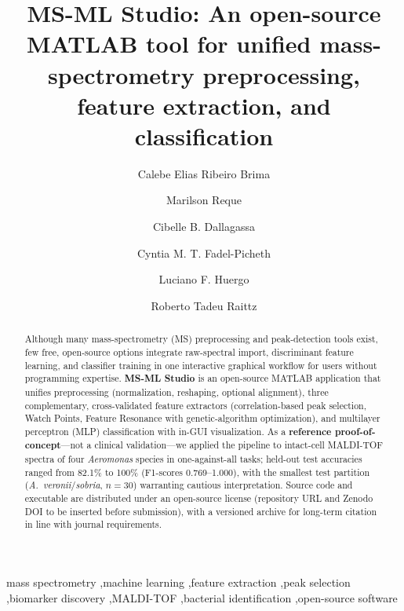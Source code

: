 \documentclass[preprint,12pt]{elsarticle}
\begin{document}
\begin{frontmatter}

\title{MS-ML Studio: An open-source MATLAB tool for unified mass-spectrometry preprocessing, feature extraction, and classification}

\address[addr1]{Departamento de Bioinform{\'a}tica, Universidade Federal do Paran{\'a}, Brazil}
\address[addr2]{Setor Litoral, Universidade Federal do Paran{\'a}, Brazil}
\address[addr3]{Departamento de Patologia M{\'e}dica, Universidade Federal do Paran{\'a}, Brazil}

\author[addr1]{Calebe Elias Ribeiro Brima}
\author[addr1]{Marilson Reque}
\author[addr3]{Cibelle B. Dallagassa}
\author[addr3]{Cyntia M. T. Fadel-Picheth}
\author[addr2]{Luciano F. Huergo}
\author[addr1]{Roberto Tadeu Raittz}

\begin{abstract}
Although many mass-spectrometry (MS) preprocessing and peak-detection tools exist, few free, open-source options integrate raw-spectral import, discriminant feature learning, and classifier training in one interactive graphical workflow for users without programming expertise. \textbf{MS-ML Studio} is an open-source MATLAB application that unifies preprocessing (normalization, reshaping, optional alignment), three complementary, cross-validated feature extractors (correlation-based peak selection, Watch Points, Feature Resonance with genetic-algorithm optimization), and multilayer perceptron (MLP) classification with in-GUI visualization. As a \textbf{reference proof-of-concept}---not a clinical validation---we applied the pipeline to intact-cell MALDI-TOF spectra of four \textit{Aeromonas} species in one-against-all tasks; held-out test accuracies ranged from 82.1\% to 100\% (F1-scores 0.769--1.000), with the smallest test partition (\textit{A.~veronii}/\textit{sobria}, $n=30$) warranting cautious interpretation. Source code and executable are distributed under an open-source license (repository URL and Zenodo DOI to be inserted before submission), with a versioned archive for long-term citation in line with journal requirements.
\end{abstract}

\begin{keyword}
mass spectrometry \sep machine learning \sep feature extraction \sep peak selection \sep biomarker discovery \sep MALDI-TOF \sep bacterial identification \sep open-source software
\end{keyword}

\end{frontmatter}
\end{document}
